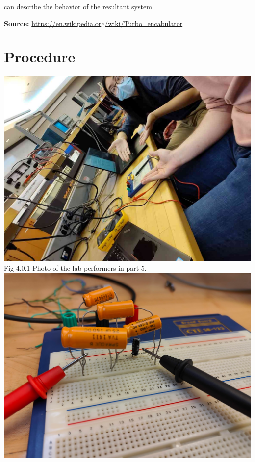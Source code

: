 \documentclass[titlepage]{article}
\begin{document}
can describe the behavior of the resultant system.

\textbf{Source:} \url{https://en.wikipedia.org/wiki/Turbo_encabulator}
	

	\section{Procedure}
\begin{center}
	\vspace{1cm}
	\includegraphics[scale=0.2]{selfies/selfie-part5.jpg}\\
	Fig 4.0.1 Photo of the lab performers in part 5.\\
	\vspace{1cm}
	\includegraphics[scale=0.14]{selfies/part-5.png}\\

\end{center}
\end{document}
